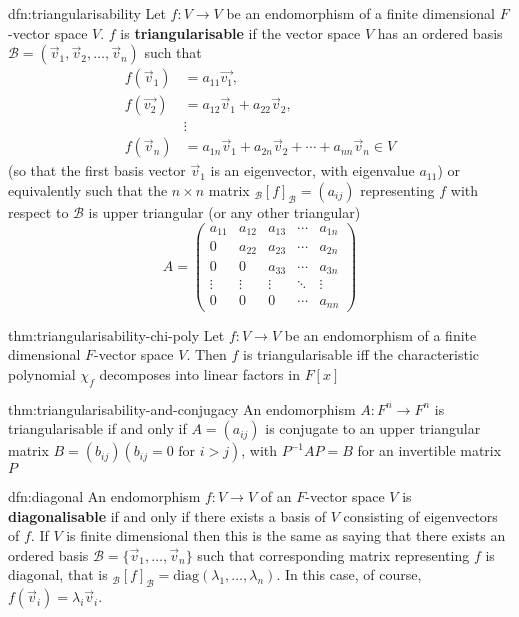 \documentclass[landscape, 8pt]{extarticle}
\begin{document}
\begin{multicols}{3}
\begin{dfn}[Triangularisability]{dfn:triangularisability}{}
    Let $f : V \to V$ be an endomorphism of a finite dimensional $F$-vector space $V$. $f$ is \textbf{triangularisable} if the vector space $V$ has an ordered basis $\mathcal{B} = (\vec{v}_{1}, \vec{v}_{2},\dots,\vec{v}_{n})$ such that
        \begin{align*}
            f(\vec{v}_{1}) &= a_{11}\vec{v_{1}}, \\
            f(\vec{v_{2}}) &= a_{12}\vec{v}_{1} + a_{22}\vec{v}_{2}, \\
            &\vdots \\
            f(\vec{v}_{n}) &= a_{1n}\vec{v}_{1} + a_{2n}\vec{v}_{2} + \cdots + a_{nn}\vec{v}_{n}\in V
        \end{align*}
        (so that the first basis vector $\vec{v}_{1}$ is an eigenvector, with eigenvalue $a_{11}$) or equivalently such that the $n \times n$ matrix $_{\mathcal{B}}[f]_{\mathcal{B}} = (a_{ij})$ representing $f$ with respect to $\mathcal{B}$ is upper triangular (or any other triangular)
        \[A = \begin{pmatrix}
            a_{11}& a_{12}& a_{13}& \cdots & a_{1n} \\
            0& a_{22}& a_{23}& \cdots& a_{2n} \\
            0 & 0& a_{33}& \cdots& a_{3n} \\
            \vdots& \vdots& \vdots& \ddots& \vdots \\
            0 & 0& 0& \cdots& a_{nn}
        \end{pmatrix}\]
\end{dfn}


\begin{thm}[]{thm:triangularisability-chi-poly}{}
    Let $f : V \to V$ be an endomorphism of a finite dimensional $F$-vector space $V$. Then $f$ is triangularisable iff the characteristic polynomial $\chi_{f}$ decomposes into linear factors in $F[x]$
\end{thm}

\begin{thm}{thm:triangularisability-and-conjugacy}{}
    An endomorphism $A : F^{n} \to F^{n}$ is triangularisable if and only if $A = (a_{ij})$ is conjugate to an upper triangular matrix $B = (b_{ij})(b_{ij} = 0 \text{ for $i > j$})$, with $P^{-1} AP=B$ for an invertible matrix $P$
\end{thm}

\begin{dfn}[Diagonalisability]{dfn:diagonal}{}
    An endomorphism $f : V \to V$ of an $F$-vector space $V$ is \textbf{diagonalisable} if and only if there exists a basis of $V$ consisting of eigenvectors of $f$. If $V$ is finite dimensional then this is the same as saying that there exists an ordered basis $\mathcal{B} = \{\vec{v}_{1},\dots,\vec{v}_{n}\}$ such that corresponding matrix representing $f$ is diagonal, that is $_{\mathcal{B}}[f]_{\mathcal{B}} = \text{diag}(\lambda_{1},\dots,\lambda_{n})$. In this case, of course, $f(\vec{v}_{i}) = \lambda_{i}\vec{v}_{i}$.
    

\end{dfn}
\end{multicols}
\end{document}
